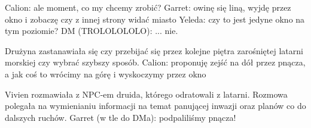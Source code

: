 \documentclass[10pt,twoside,twocolumn]{book}
\begin{document}
%    
%       
Calion: ale moment, co my chcemy zrobić?
Garret: owinę się liną, wyjdę przez okno i zobaczę czy z innej strony widać miasto
Yeleda: czy to jest jedyne okno na tym poziomie?
DM (TROLOLOLOLO): ... nie.

%    
%       
Drużyna zastanawiała się czy przebijać się przez kolejne piętra zarośniętej latarni morskiej czy wybrać szybszy sposób.
Calion: proponuję zejść na dół przez pnącza, a jak coś to wrócimy na górę i wyskoczymy przez okno

%    
%       
Vivien rozmawiała z NPC-em druida, którego odratowali z latarni. Rozmowa polegała na wymienianiu informacji na temat panującej inwazji oraz planów co do dalszych ruchów.
Garret (w tle do DMa): podpaliliśmy pnącza!
\end{document}
